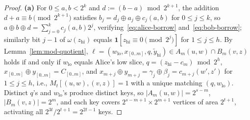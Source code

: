 \documentclass[11pt,reqno]{amsart}
\theoremstyle{definition}
\theoremstyle{remark}
\newcommand{\ind}{\mathbf{1}}
\numberwithin{equation}{section}
\begin{document}
\begin{proof}
\textbf{(a)} For $0 \le a, b < 2^k$ and $d := (b - a) \bmod 2^{k+1}$, the addition $d + a \equiv b \pmod{2^{k+1}}$ satisfies $b_j = d_j \oplus a_j \oplus c_j(a, b)$ for $0 \le j \le k$, so $a \oplus b \oplus d = \sum_{j=0}^k c_j(a, b) 2^j$, verifying~\eqref{eq:alice-borrow} and~\eqref{eq:bob-borrow}; similarly bit $j - 1$ of $\omega(z_{\mathrm{hi}})$ equals $\ind[z_{\mathrm{hi}} \equiv 0 \pmod{2^j}]$ for $1 \le j \le h$. By Lemma~\ref{lem:mod-quotient}, $\ell = (w_{\mathrm{lo}}, x_{[0..m]}, q, \tilde{y}_{\mathrm{hi}}) \in A_m(u, w) \cap B_m(v, z)$ holds if and only if $w_{\mathrm{lo}}$ equals Alice's low slice, $q = (z_{\mathrm{hi}} - c_m) \bmod 2^h$, $x_{[0..m]} \oplus y_{[0..m]} = C_{[0..m]}$, and $x_{m+j} \oplus y_{m+j} = \gamma_j \oplus \beta_j = c_{m+j}(w', z')$ for $1 \le j \le h$, i.e., $M_t[(u, w), (v, z)] = 1$ with a unique matching $(q, w_{\mathrm{lo}})$. Distinct $q$'s and $w_{\mathrm{lo}}$'s produce distinct keys, so $|A_m(u, w)| = 2^{s-m}$, $|B_m(v, z)| = 2^m$, and each key covers $2^{s-m+1} \times 2^{m+1}$ vertices of area $2^{t+1}$, activating all $2^{3t}/2^{t+1} = 2^{2t-1}$ keys.


\end{proof}
\end{document}
